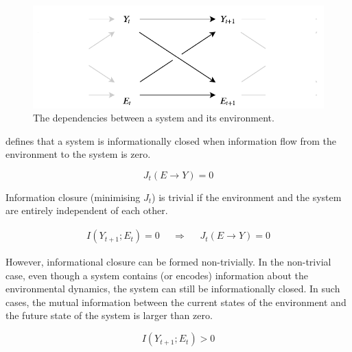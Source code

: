 \documentclass[utf8]{article}
\begin{document}
            
				\begin{figure}
					\includegraphics[width=\textwidth]{WritingMaterials/Fig_SystemAndEnv/SystemAndEnv_2.pdf}
					\caption{The dependencies between a system and its environment.} %
					\label{fig:SystemAndEnv}
				\end{figure}


			\noindent
			\cite{BERTSCHINGER.2006} defines that a system is informationally closed when information flow from the environment to the system is zero.

				\begin{equation}
				J_{t}(E \rightarrow Y )=0
				\label{eq:informationflow2}
				\end{equation}


			\noindent
			Information closure (minimising $J_t$) is trivial if the environment and the system are entirely independent of each other.

				\begin{equation}
				\begin{aligned}
				{I(Y_{t+1};E_{t})=0}&&{\Rightarrow}&&{J_{t}(E \rightarrow Y )=0}
				\end{aligned}
				\end{equation}


			\noindent
			However, informational closure can be formed non-trivially. In the non-trivial case, even though a system contains (or encodes) information about the environmental dynamics, the system can still be informationally closed. In such cases, the mutual information between the current states of the environment and the future state of the system is larger than zero.

				\begin{equation}
				I(Y_{t+1};E_{t}) > 0
				\end{equation}
\end{document}
